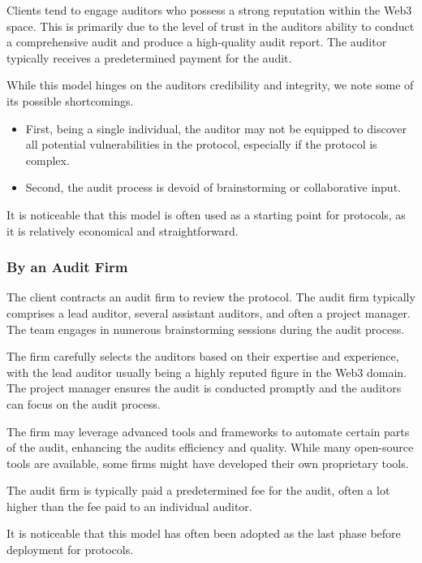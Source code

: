\documentclass[10pt]{extarticle}
\begin{document}
Clients tend to engage auditors who possess a strong reputation within
the Web3 space. This is primarily due to the level of trust in the
auditor\textquotesingle s ability to conduct a comprehensive audit and
produce a high-quality audit report. The auditor typically receives a
predetermined payment for the audit.

While this model hinges on the auditor\textquotesingle s credibility and
integrity, we note some of its possible shortcomings.

\begin{itemize}
\item
  First, being a single individual, the auditor may not be equipped to
  discover all potential vulnerabilities in the protocol, especially if
  the protocol is complex.
\item
  Second, the audit process is devoid of brainstorming or collaborative
  input.
\end{itemize}

It is noticeable that this model is often used as a starting point for
protocols, as it is relatively economical and straightforward.

\subsubsection{ By an Audit Firm}\label{312-by-an-audit-firm}

The client contracts an audit firm to review the protocol. The audit
firm typically comprises a lead auditor, several assistant auditors, and
often a project manager. The team engages in numerous brainstorming
sessions during the audit process.

The firm carefully selects the auditors based on their expertise and
experience, with the lead auditor usually being a highly reputed figure
in the Web3 domain. The project manager ensures the audit is conducted
promptly and the auditors can focus on the audit process.

The firm may leverage advanced tools and frameworks to automate certain
parts of the audit, enhancing the audit\textquotesingle s efficiency and
quality. While many open-source tools are available, some firms might
have developed their own proprietary tools.

The audit firm is typically paid a predetermined fee for the audit,
often a lot higher than the fee paid to an individual auditor.

It is noticeable that this model has often been adopted as the last
phase before deployment for protocols.
\end{document}
